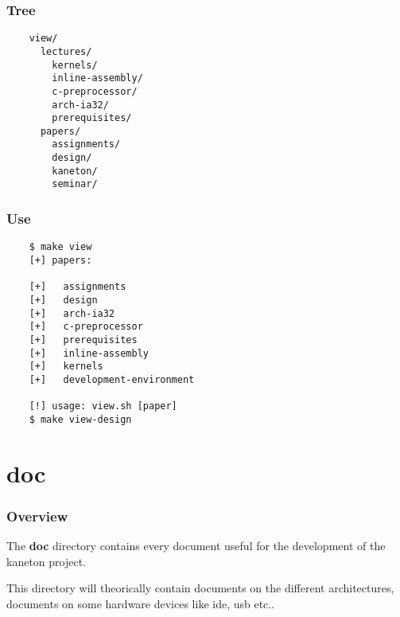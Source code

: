 \begin{frame}[containsverbatim]
  \frametitle{Tree}

  \begin{verbatim}
    view/
      lectures/
        kernels/
        inline-assembly/
        c-preprocessor/
        arch-ia32/
        prerequisites/
      papers/
        assignments/
        design/
        kaneton/
        seminar/
  \end{verbatim}
\end{frame}


\begin{frame}[containsverbatim]
  \frametitle{Use}

  \begin{verbatim}
    $ make view
    [+] papers:

    [+]   assignments
    [+]   design
    [+]   arch-ia32
    [+]   c-preprocessor
    [+]   prerequisites
    [+]   inline-assembly
    [+]   kernels
    [+]   development-environment

    [!] usage: view.sh [paper]
    $ make view-design
  \end{verbatim}
\end{frame}

%
%

\section{doc}


\begin{frame}
  \frametitle{Overview}

  The \textbf{doc} directory contains every document useful for
  the development of the kaneton project.

  \nl

  This directory will theorically contain documents on the different
  architectures, documents on some hardware devices like ide, usb etc..
\end{frame}


